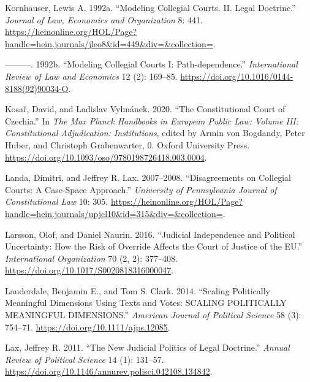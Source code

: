\documentclass[
  11pt,
]{article}
\newlength{\cslhangindent}
\newenvironment{CSLReferences}[2] %
 {%
  \setlength{\parindent}{0pt}
  \ifodd #1 \everypar{\setlength{\hangindent}{\cslhangindent}}\ignorespaces\fi
  \ifnum #2 > 0
  \setlength{\parskip}{#2\baselineskip}
  \fi
 }%
 {}
\begin{document}
\begin{CSLReferences}{1}{0}
\leavevmode{}%
Kornhauser, Lewis A. 1992a. {``Modeling {Collegial Courts}. {II}. {Legal
Doctrine}.''} \emph{Journal of Law, Economics and Organization} 8: 441.
\url{https://heinonline.org/HOL/Page?handle=hein.journals/jleo8&id=449&div=&collection=}.

\leavevmode{}%
---------. 1992b. {``Modeling Collegial Courts {I}:
{Path-dependence}.''} \emph{International Review of Law and Economics}
12 (2): 169--85. \url{https://doi.org/10.1016/0144-8188(92)90034-O}.

\leavevmode{}%
Kosař, David, and Ladislav Vyhnánek. 2020. {``The {Constitutional Court}
of {Czechia}.''} In \emph{The {Max Planck Handbooks} in {European Public
Law}: {Volume III}: {Constitutional Adjudication}: {Institutions}},
edited by Armin von Bogdandy, Peter Huber, and Christoph Grabenwarter,
0. Oxford University Press.
\url{https://doi.org/10.1093/oso/9780198726418.003.0004}.

\leavevmode{}%
Landa, Dimitri, and Jeffrey R. Lax. 2007--2008. {``Disagreements on
{Collegial Courts}: {A Case-Space Approach}.''} \emph{University of
Pennsylvania Journal of Constitutional Law} 10: 305.
\url{https://heinonline.org/HOL/Page?handle=hein.journals/upjcl10&id=315&div=&collection=}.

\leavevmode{}%
Larsson, Olof, and Daniel Naurin. 2016. {``Judicial {Independence} and
{Political Uncertainty}: {How} the {Risk} of {Override Affects} the
{Court} of {Justice} of the {EU}.''} \emph{International Organization}
70 (2, 2): 377--408. \url{https://doi.org/10.1017/S0020818316000047}.

\leavevmode{}%
Lauderdale, Benjamin E., and Tom S. Clark. 2014. {``Scaling {Politically
Meaningful Dimensions Using Texts} and {Votes}: {SCALING POLITICALLY
MEANINGFUL DIMENSIONS}.''} \emph{American Journal of Political Science}
58 (3): 754--71. \url{https://doi.org/10.1111/ajps.12085}.

\leavevmode{}%
Lax, Jeffrey R. 2011. {``The {New Judicial Politics} of {Legal
Doctrine}.''} \emph{Annual Review of Political Science} 14 (1): 131--57.
\url{https://doi.org/10.1146/annurev.polisci.042108.134842}.


\end{CSLReferences}
\end{document}
